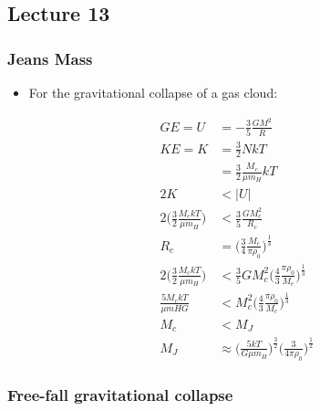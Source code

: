 \documentclass[a4paper,11pt,normalem]{article}
\begin{document}
\subsection{Lecture 13}\label{lecture-13}

\subsubsection{Jeans Mass}\label{jeans-mass}

\begin{itemize}
\item
  For the gravitational collapse of a gas cloud:
\end{itemize}

\[
    \begin{aligned}
    GE = U &= -\frac{3}{5}\frac{GM^2}{R} \\
    KE = K &= \frac{3}{2}NkT \\
    &= \frac{3}{2}\frac{M_c}{\mu m_H}kT \\
    2K &< |U| \\
    2\Bigg(\frac{3}{2}\frac{M_c kT}{\mu m_H}\Bigg) &< \frac{3}{5}\frac{GM_c^2}{R_c} \\
    R_c &= \Bigg(\frac{3}{4}\frac{M_c}{\pi \rho_0}\Bigg)^{\frac{1}{3}} \\
    2\Bigg(\frac{3}{2}\frac{M_c kT}{\mu m_H}\Bigg) &< \frac{3}{5}GM_c^2 \Bigg(\frac{4}{3}\frac{\pi \rho_0}{M_c}\Bigg)^{\frac{1}{3}} \\
    \frac{5M_c kT}{\mu mH G} &< M_c^2 \Bigg(\frac{4}{3}\frac{\pi \rho_0}{M_c}\Bigg)^{\frac{1}{3}} \\
    M_c &< M_J \\
    M_J &\approx \Bigg(\frac{5kT}{G\mu m_H}\Bigg)^{\frac{3}{2}} \Bigg(\frac{3}{4\pi\rho_0}\Bigg)^{\frac{1}{2}}
    \end{aligned}
\]

\subsubsection{Free-fall gravitational
collapse}\label{free-fall-gravitational-collapse}
\end{document}
